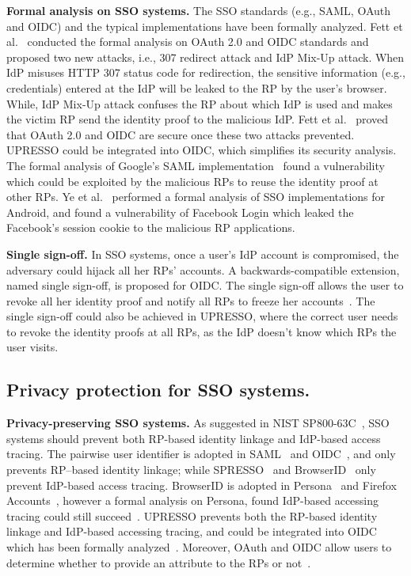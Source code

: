 \noindent\textbf{Formal analysis on SSO systems.} The SSO standards (e.g., SAML, OAuth and OIDC) and the typical implementations have been formally analyzed. 
Fett et al.~\cite{FettKS16, FettKS17} conducted the formal analysis on OAuth 2.0 and OIDC standards and proposed two new attacks, i.e., 307 redirect attack and IdP Mix-Up attack. When IdP misuses HTTP 307 status code for redirection, the sensitive information (e.g., credentials) entered at the IdP will  be leaked to the RP by the user's browser. While, IdP Mix-Up attack confuses the RP about which IdP is used and makes the victim RP send the identity proof to the malicious IdP.
Fett et al.~\cite{FettKS16, FettKS17} proved that OAuth 2.0 and OIDC are secure once these two attacks  prevented. UPRESSO could be integrated into OIDC, which simplifies its security analysis.
The formal analysis of Google's SAML implementation~\cite{ArmandoCCCT08} found a vulnerability which could be exploited by the malicious RPs to reuse the identity proof at other RPs.
Ye et al.~\cite{YeBWD15} performed a formal analysis of  SSO implementations for Android, and found a vulnerability of Facebook Login which leaked the Facebook's session cookie to the  malicious RP applications.


\noindent\textbf{Single sign-off.} In SSO systems, once a user's IdP account is compromised, the adversary could hijack all her RPs' accounts. A backwards-compatible extension, named single sign-off, is proposed for OIDC. The single sign-off  allows the user to revoke all her identity proof and notify all RPs to freeze her accounts~\cite{GhasemisharifRC18}. The single sign-off could also be achieved in UPRESSO, where the correct user needs to revoke the identity proofs at all RPs, as the IdP doesn't know which RPs the user visits.

\subsection{Privacy protection for SSO systems.}

\noindent\textbf{Privacy-preserving SSO systems.}
As suggested in NIST SP800-63C~\cite{NIST2017draft}, SSO systems should prevent both  RP-based identity linkage and IdP-based access tracing. The pairwise user identifier is adopted in SAML~\cite{SAML} and OIDC~\cite{OpenIDConnect}, and only prevents RP--based identity linkage; while SPRESSO~\cite{SPRESSO} and BrowserID~\cite{BrowserID} only prevent  IdP-based access tracing. BrowserID is adopted in Persona~\cite{persona} and Firefox Accounts~\cite{FirefoxAccount}, however a formal analysis on Persona, found IdP-based accessing tracing could still succeed~\cite{FettKS14, BrowserID}. UPRESSO prevents both the RP-based identity linkage and IdP-based accessing tracing, and could be integrated into OIDC which has been formally analyzed~\cite{FettKS17}. Moreover, OAuth and OIDC allow users to determine whether to provide an attribute to the RPs or not~\cite{ChenPCTKT14,YangLLZH16}.


